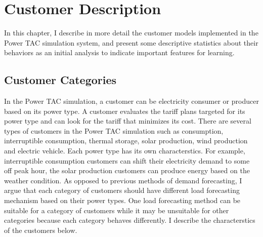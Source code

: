 
\chapter{Customer Description}  \label{customer-description}

In this chapter, I describe in more detail the customer models implemented in the Power TAC simulation system, and present some descriptive statistics about their behaviors as an initial analysis to indicate important features for learning.

\section{Customer Categories}


In the Power TAC simulation, a customer can be electricity consumer or producer based on its power type. A customer evaluates the tariff plans targeted for its power type and can look for the tariff that minimizes its cost. There are several types of customers in the Power TAC simulation such as consumption, interruptible consumption, thermal storage, solar production, wind production and electric vehicle. Each power type has its own characterstics. For example, interruptible consumption customers can shift their electricity demand to some off peak hour, the solar production customers can produce energy based on the weather condition. As opposed to previous methods of demand forecasting, I argue that each category of customers should have different load forecasting mechanism based on their power types. One load forecasting method can be suitable for a category of customers while it may be unsuitable for other categories because each category behaves differently. I describe the characterstics of the customers below.

